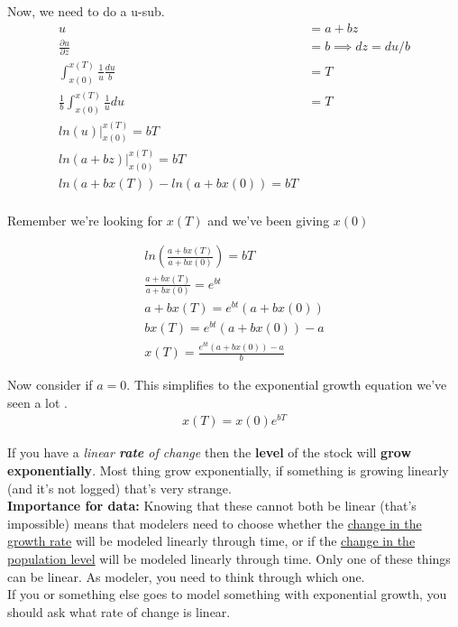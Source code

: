 \documentclass{article}
\begin{document}
Now, we need to do a u-sub. 
\begin{align*}
    u &= a + bz\\
    \frac{\partial u}{\partial z} &= b \implies dz = du / b\\
    \int_{x(0)}^{x(T)} \frac{1}{u} \frac{du}{b} &= T \\
    \frac{1}{b }\int_{x(0)}^{x(T)} \frac{1}{u} du &= T\\
    ln(u)|_{x(0)}^{x(T)} = bT \\
    ln(a + bz) |_{x(0)}^{x(T)} = bT \\
    ln(a + b x(T)) - ln (a + b x(0)) = bT \\
\end{align*}

Remember we're looking for $x(T)$ and we've been giving $x(0)$

\begin{align*}
    ln(\frac{a + b x(T)}{a + b x(0)}) = bT \\
    \frac{a + b x(T)}{a + b x(0)} = e^{bt} \\
    a + b x(T) = e^{bt} (a + b x(0)) \\
    b x(T) = e^{bt} (a + b x(0)) - a \\
    x(T) = \frac{e^{bt} (a + b x(0)) - a}{b}
\end{align*}

Now consider if $a = 0$. This simplifies to the exponential growth equation we've seen a lot .
\begin{align*}
    x(T) = x(0) e^{bT} 
\end{align*}


If you have a \textit{linear \textbf{rate} of change} then the \textbf{level} of the stock will \textbf{grow exponentially}. Most thing grow exponentially, if something is growing linearly (and it's not logged) that's very strange. \\


\textbf{Importance for data:} Knowing that these cannot both be linear (that's impossible) means that modelers need to choose whether the \underline{change in the growth rate} will be modeled linearly through time, or if the \underline{change in the population level} will be modeled linearly through time. Only one of these things can be linear. As modeler, you need to think through which one.\\

If you or something else goes to model something with exponential growth, you should ask what rate of change is linear. 
\end{document}

